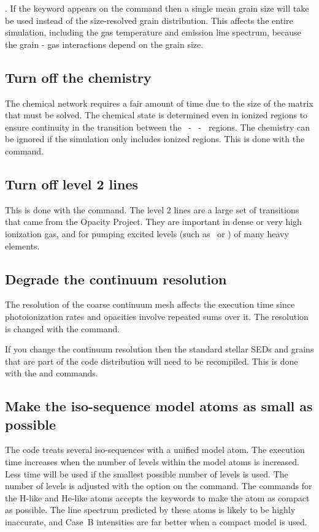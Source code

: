 .
If the  keyword appears
on the  command then a single mean grain size
will take be used instead
of the size-resolved grain distribution.
This affects the entire simulation,
including the gas temperature and emission line spectrum,
because the grain
- gas interactions depend on the grain size.

\subsection{Turn off the chemistry}

The chemical network requires a fair amount of time due to the size of
the matrix that must be solved.
The chemical state is determined even in
ionized regions to ensure continuity in the transition
between the \hplus\ - \hO\ - \htwo\ regions.
The chemistry can be ignored if the simulation only includes ionized regions.
This is done with the  command.

\subsection{Turn off level 2 lines}

This is done with the  command.
The level 2 lines are a large set of transitions that came
from the Opacity Project.
They are important in dense or very high
ionization gas,
and for pumping excited levels (such as \ci*\ or \cii*)
of many heavy elements.

\subsection{Degrade the continuum resolution }

The resolution of the coarse continuum mesh affects the execution time
since photoionization rates and opacities involve repeated sums over it.
The resolution is changed with the  command.

If you change the continuum resolution then the standard stellar SEDs and
grains that are part of the code distribution will need to be recompiled.
This is done with the  
and   commands.

\subsection{Make the iso-sequence model atoms as small as possible}

The code treats several iso-sequences with a unified model atom.
The
execution time increases when the number of levels within the model atoms
is increased.
Less time will be used if the smallest possible number of
levels is used.
The number of levels is adjusted with the  option
on the  command.
The
 commands for the
H-like and He-like atoms accepts the keywords 
to make the atom
as compact as possible.
The line spectrum predicted by these atoms is likely
to be highly inaccurate,
and Case~B intensities are far better when a compact model is used.

